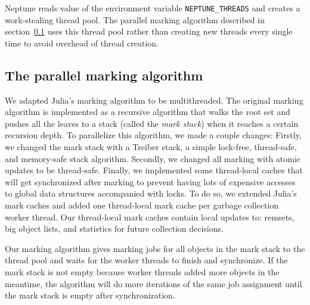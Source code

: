 Neptune reads value of the environment variable \texttt{NEPTUNE\_THREADS} and creates a work-stealing thread pool.
The parallel marking algorithm described in section~\ref{marking_algo} uses this thread pool rather than creating new threads every single time to avoid overhead of thread creation.

\subsection{The parallel marking algorithm}
\label{marking_algo}
We adapted Julia's marking algorithm to be multithreaded.
The original marking algorithm is implemented as a recursive algorithm that walks the root set and pushes all the leaves to a stack (called the \emph{mark stack}) when it reaches a certain recursion depth.
To parallelize this algorithm, we made a couple changes:
Firstly, we changed the mark stack with a Treiber stack, a simple lock-free, thread-safe, and memory-safe stack algorithm.
Secondly, we changed all marking with atomic updates to be thread-safe.
Finally, we implemented some thread-local caches that will get synchronized after marking to prevent having lots of expensive accesses to global data structures accompanied with locks.
To do so, we extended Julia's mark caches and added one thread-local mark cache per garbage collection worker thread.
Our thread-local mark caches contain local updates to: remsets, big object lists, and statistics for future collection decisions.

Our marking algorithm gives marking jobs for all objects in the mark stack to the thread pool and waits for the worker threads to finish and synchronize.
If the mark stack is not empty because worker threads added more objects in the meantime, the algorithm will do more iterations of the same job assignment until the mark stack is empty after synchronization.

